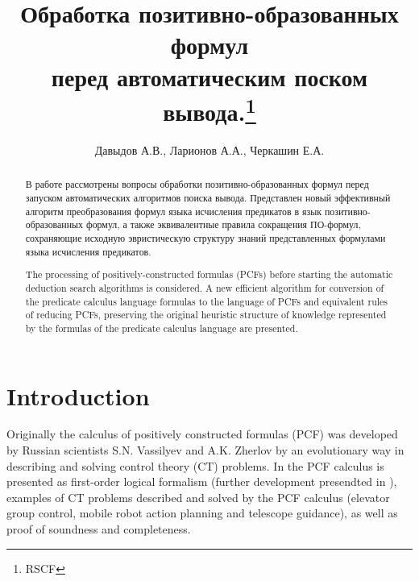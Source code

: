 \documentclass[a4paper,12pt]{article}
\title{Обработка позитивно-образованных формул\\ перед автоматическим поском вывода.\thanks{RSCF}}
\author{Давыдов А.В., Ларионов А.А., Черкашин Е.А.}
\date{}
\begin{document}
\maketitle

\begin{abstract}
В работе рассмотрены вопросы обработки позитивно-образованных формул перед запуском автоматических алгоритмов поиска вывода. Представлен новый эффективный алгоритм преобразования формул языка исчисления предикатов в язык позитивно-образованных формул, а также эквивалентные правила сокращения ПО-формул, сохраняющие исходную эвристическую структуру знаний представленных формулами языка исчисления предикатов.

The processing of positively-constructed formulas (PCFs) before starting the automatic deduction search algorithms is considered. A new efficient algorithm for conversion of the predicate calculus language formulas to the language of PCFs and equivalent rules of reducing PCFs, preserving the original heuristic structure of knowledge represented by the formulas of the predicate calculus language are presented.

\end{abstract}


\newtheorem{definition}{Definition}
\newtheorem{example}{Example}

\newcommand{\fictAquantor}{\ensuremath{\forall\colon\varnothing}}
\newcommand{\fictEquantor}{\ensuremath{\exists\colon\varnothing}}
\newcommand{\bomega}{\boldsymbol{\omega}}
\newcommand{\bphi}{\boldsymbol{\phi}}
\newcommand{\eqdef}{\stackrel{\mathrm{df}}{=}}
\newcommand{\bigand}[2]{\raisebox{-2pt}{\ensuremath{\overset{#1}{\underset{#2}{\text{\Large\&\normalfont}}}}}}



\section{Introduction}

Originally \cite{SNV1990,ICDS2000} the calculus of positively constructed formulas (PCF) was developed by Russian scientists S.N. Vassilyev and A.K. Zherlov by an evolutionary way in describing and solving control theory (CT) problems. In \cite{ICDS2000} the PCF calculus is presented as first-order logical formalism (further development presendted in \cite{jour2} ), examples of CT problems described and solved by the PCF calculus (elevator group control, mobile robot action planning and telescope guidance), as well as proof of soundness and completeness.
\end{document}
